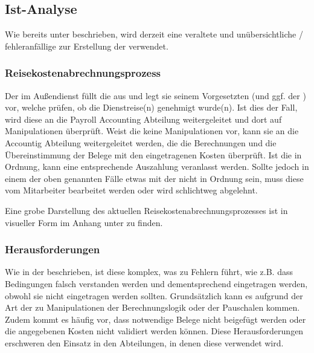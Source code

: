 \subsection{Ist-Analyse}

Wie bereits unter  beschrieben, wird derzeit eine veraltete und unübersichtliche / fehleranfällige  zur Erstellung der  verwendet. 

\subsubsection{Reisekostenabrechnungsprozess}
\label{sec:Analysephase:Reisekostenabrechnungsprozess}

Der  im Außendienst füllt die  aus und legt sie seinem Vorgesetzten (und ggf. der ) vor, welche prüfen, ob die Dienstreise(n) genehmigt wurde(n). Ist dies der Fall, wird diese an die Payroll Accounting Abteilung weitergeleitet und dort auf Manipulationen überprüft. Weist die  keine Manipulationen vor, kann sie an die Accountig Abteilung weitergeleitet werden, die die Berechnungen und die Übereinstimmung der Belege mit den eingetragenen Kosten überprüft. Ist die  in Ordnung, kann eine entsprechende Auszahlung veranlasst werden. Sollte jedoch in einem der oben genannten Fälle etwas mit der  nicht in Ordnung sein, muss diese vom Mitarbeiter bearbeitet werden oder wird schlichtweg abgelehnt.

Eine grobe Darstellung des aktuellen Reisekostenabrechnungsprozesses ist in visueller Form im Anhang unter  zu finden.

\subsubsection{Herausforderungen}

Wie in der  beschrieben, ist diese  komplex, was zu Fehlern führt, wie z.B. dass Bedingungen falsch verstanden werden und dementsprechend eingetragen werden, obwohl sie nicht eingetragen werden sollten. Grundsätzlich kann es aufgrund der Art der  zu Manipulationen der Berechnungslogik oder der Pauschalen kommen. Zudem kommt es häufig vor, dass notwendige Belege nicht beigefügt werden oder die angegebenen Kosten nicht validiert werden können. Diese Herausforderungen erschweren den Einsatz in den Abteilungen, in denen diese verwendet wird.

